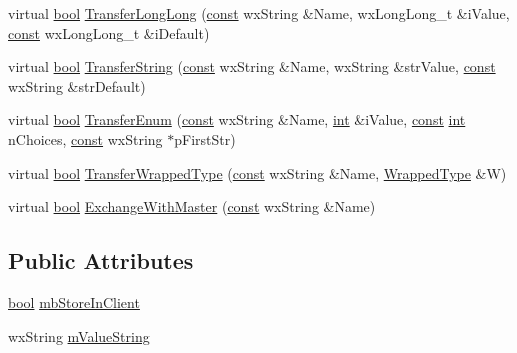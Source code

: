 \begin{DoxyCompactItemize}
\item 
virtual \hyperlink{mac_2config_2i386_2lib-src_2libsoxr_2soxr-config_8h_abb452686968e48b67397da5f97445f5b}{bool} \hyperlink{class_shuttle_ab9d16128c80cdb3c494b0830127a6936}{Transfer\+Long\+Long} (\hyperlink{getopt1_8c_a2c212835823e3c54a8ab6d95c652660e}{const} wx\+String \&Name, wx\+Long\+Long\+\_\+t \&i\+Value, \hyperlink{getopt1_8c_a2c212835823e3c54a8ab6d95c652660e}{const} wx\+Long\+Long\+\_\+t \&i\+Default)
\item 
virtual \hyperlink{mac_2config_2i386_2lib-src_2libsoxr_2soxr-config_8h_abb452686968e48b67397da5f97445f5b}{bool} \hyperlink{class_shuttle_a201dc27d8088516b2608d30844a0c699}{Transfer\+String} (\hyperlink{getopt1_8c_a2c212835823e3c54a8ab6d95c652660e}{const} wx\+String \&Name, wx\+String \&str\+Value, \hyperlink{getopt1_8c_a2c212835823e3c54a8ab6d95c652660e}{const} wx\+String \&str\+Default)
\item 
virtual \hyperlink{mac_2config_2i386_2lib-src_2libsoxr_2soxr-config_8h_abb452686968e48b67397da5f97445f5b}{bool} \hyperlink{class_shuttle_af7f9fc3685c4916b699a7fb99959c96d}{Transfer\+Enum} (\hyperlink{getopt1_8c_a2c212835823e3c54a8ab6d95c652660e}{const} wx\+String \&Name, \hyperlink{xmltok_8h_a5a0d4a5641ce434f1d23533f2b2e6653}{int} \&i\+Value, \hyperlink{getopt1_8c_a2c212835823e3c54a8ab6d95c652660e}{const} \hyperlink{xmltok_8h_a5a0d4a5641ce434f1d23533f2b2e6653}{int} n\+Choices, \hyperlink{getopt1_8c_a2c212835823e3c54a8ab6d95c652660e}{const} wx\+String $\ast$p\+First\+Str)
\item 
virtual \hyperlink{mac_2config_2i386_2lib-src_2libsoxr_2soxr-config_8h_abb452686968e48b67397da5f97445f5b}{bool} \hyperlink{class_shuttle_a4159e8ac5790878b1af7275e35f5e841}{Transfer\+Wrapped\+Type} (\hyperlink{getopt1_8c_a2c212835823e3c54a8ab6d95c652660e}{const} wx\+String \&Name, \hyperlink{class_wrapped_type}{Wrapped\+Type} \&W)
\item 
virtual \hyperlink{mac_2config_2i386_2lib-src_2libsoxr_2soxr-config_8h_abb452686968e48b67397da5f97445f5b}{bool} \hyperlink{class_shuttle_aa12f0bbb3b5aa1c339678295c8aaf6cd}{Exchange\+With\+Master} (\hyperlink{getopt1_8c_a2c212835823e3c54a8ab6d95c652660e}{const} wx\+String \&Name)
\end{DoxyCompactItemize}
\subsection*{Public Attributes}
\begin{DoxyCompactItemize}
\item 
\hyperlink{mac_2config_2i386_2lib-src_2libsoxr_2soxr-config_8h_abb452686968e48b67397da5f97445f5b}{bool} \hyperlink{class_shuttle_aa0cbdc074660fe8fc0aa419d40e31443}{mb\+Store\+In\+Client}
\item 
wx\+String \hyperlink{class_shuttle_afc0ec90fcca258610453809155ef76e7}{m\+Value\+String}
\end{DoxyCompactItemize}


